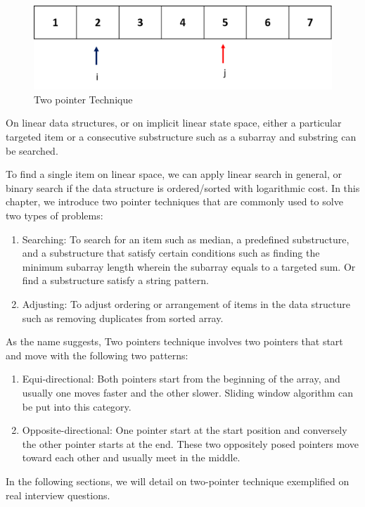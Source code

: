 \documentclass[../main.tex]{subfiles}
\begin{document}
\begin{figure}[h!]
    \centering
    \includegraphics[width=0.7\columnwidth]{fig/two_pointers.png}
    \caption{Two pointer Technique}
    \label{fig:two pointer}
\end{figure}
On linear data structures, or on implicit linear state space, either a particular targeted item or a consecutive substructure such as a subarray and substring can be searched. 

To find a single item on linear space, we can apply linear search in general, or binary search if the data structure is ordered/sorted with logarithmic cost. In this chapter, we introduce two pointer techniques that are commonly used to solve two types of problems:
\begin{enumerate}
    \item Searching: To search for an item such as median,  a predefined substructure, and a substructure that satisfy certain conditions such as finding the minimum subarray length wherein the subarray equals to a targeted sum. Or find a substructure satisfy a string pattern. 
    \item Adjusting: To adjust ordering or arrangement of items in the data structure such as removing duplicates from sorted array. 
\end{enumerate}

As the name suggests, Two pointers technique involves two pointers that start and move with the following two patterns:
\begin{enumerate}
    \item Equi-directional:  Both pointers start from the beginning of the array, and usually one moves faster and the other slower. Sliding window algorithm can be put into this category. 
    \item Opposite-directional: One pointer start at the start position and conversely the other pointer starts at the end. These two oppositely posed pointers  move toward each other and usually meet in the middle. 
\end{enumerate}
In the following sections, we will detail on two-pointer technique exemplified on real interview questions.
\end{document}
